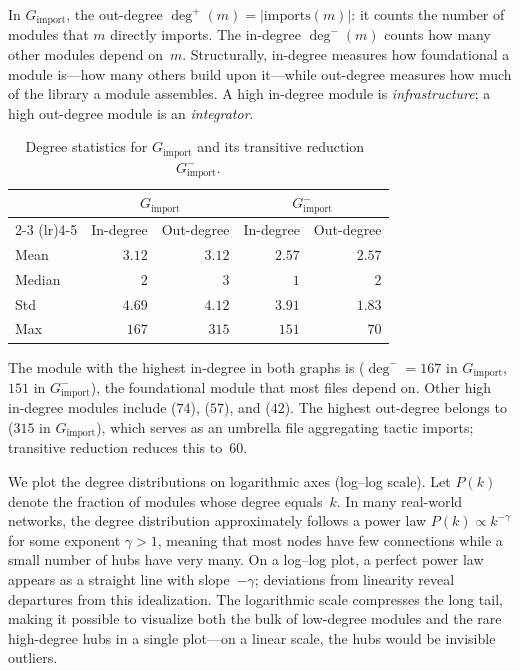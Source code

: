 In $G_{\mathrm{import}}$, the out-degree $\deg^{+}(m) = |\mathrm{imports}(m)|$: it counts the number of modules that $m$ directly imports. The in-degree $\deg^{-}(m)$ counts how many other modules depend on~$m$.
Structurally, in-degree measures how foundational a module is---how many others build upon it---while out-degree measures how much of the library a module assembles. A high in-degree module is \emph{infrastructure}; a high out-degree module is an \emph{integrator}.

\begin{table}[H]
\centering
\caption{Degree statistics for $G_{\mathrm{import}}$ and its transitive reduction~$G_{\mathrm{import}}^{-}$.}
\label{tab:degree-stats}
\begin{tabular}{lrrrr}
\toprule
& \multicolumn{2}{c}{$G_{\mathrm{import}}$} & \multicolumn{2}{c}{$G_{\mathrm{import}}^{-}$} \\
\cmidrule(lr){2-3} \cmidrule(lr){4-5}
& In-degree & Out-degree & In-degree & Out-degree \\
\midrule
Mean   & $3.12$ & $3.12$ & $2.57$ & $2.57$ \\
Median & $2$    & $3$    & $1$    & $2$    \\
Std    & $4.69$ & $4.12$ & $3.91$ & $1.83$ \\
Max    & $167$  & $315$  & $151$  & $70$   \\
\bottomrule
\end{tabular}
\end{table}

The module with the highest in-degree in both graphs is  ($\deg^{-} = 167$ in $G_{\mathrm{import}}$, $151$ in $G_{\mathrm{import}}^{-}$), the foundational module that most files depend on. Other high in-degree modules include  ($74$),  ($57$), and  ($42$). The highest out-degree belongs to  ($315$ in $G_{\mathrm{import}}$), which serves as an umbrella file aggregating tactic imports; transitive reduction reduces this to~$60$.

We plot the degree distributions on logarithmic axes (log--log scale). Let $P(k)$ denote the fraction of modules whose degree equals~$k$. In many real-world networks, the degree distribution approximately follows a power law $P(k) \propto k^{-\gamma}$ for some exponent $\gamma > 1$, meaning that most nodes have few connections while a small number of hubs have very many. On a log--log plot, a perfect power law appears as a straight line with slope~$-\gamma$; deviations from linearity reveal departures from this idealization. The logarithmic scale compresses the long tail, making it possible to visualize both the bulk of low-degree modules and the rare high-degree hubs in a single plot---on a linear scale, the hubs would be invisible outliers.

